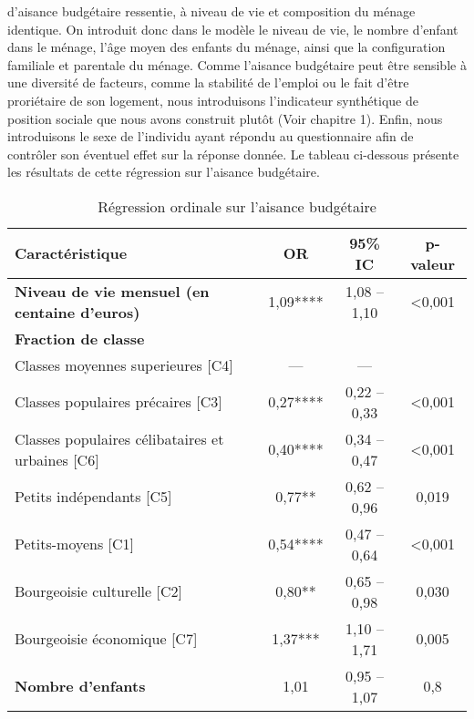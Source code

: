 \documentclass[
  12pt,
]{book}
\begin{document}
d'aisance budgétaire ressentie, à niveau de vie et composition du ménage
identique. On introduit donc dans le modèle le niveau de vie, le nombre
d'enfant dans le ménage, l'âge moyen des enfants du ménage, ainsi que la
configuration familiale et parentale du ménage. Comme l'aisance
budgétaire peut être sensible à une diversité de facteurs, comme la
stabilité de l'emploi ou le fait d'être proriétaire de son logement,
nous introduisons l'indicateur synthétique de position sociale que nous
avons construit plutôt (Voir chapitre 1). Enfin, nous introduisons le
sexe de l'individu ayant répondu au questionnaire afin de contrôler son
éventuel effet sur la réponse donnée. Le tableau ci-dessous présente les
résultats de cette régression sur l'aisance budgétaire.

\begin{table}[!h]
\centering\centering
\caption{\label{tab:AISEreg}Régression ordinale sur l'aisance budgétaire}
\centering
\fontsize{8}{10}\selectfont
\fontsize{7}{9}\selectfont
\begin{threeparttable}
\begin{tabular}[t]{lccc}
\toprule
\textbf{Caractéristique} & \textbf{OR} & \textbf{95\% IC} & \textbf{p-valeur}\\
\midrule
\textbf{Niveau de vie mensuel (en centaine d'euros)} & 1,09**** & 1,08 – 1,10 & <0,001\\
\textbf{Fraction de classe} &  &  & \\
\hspace{1em}Classes moyennes superieures [C4] & — & — & \\
\hspace{1em}Classes populaires précaires [C3] & 0,27**** & 0,22 – 0,33 & <0,001\\
\hspace{1em}Classes populaires célibataires et urbaines [C6] & 0,40**** & 0,34 – 0,47 & <0,001\\
\addlinespace
\hspace{1em}Petits indépendants [C5] & 0,77** & 0,62 – 0,96 & 0,019\\
\hspace{1em}Petits-moyens [C1] & 0,54**** & 0,47 – 0,64 & <0,001\\
\hspace{1em}Bourgeoisie culturelle [C2] & 0,80** & 0,65 – 0,98 & 0,030\\
\hspace{1em}Bourgeoisie économique [C7] & 1,37*** & 1,10 – 1,71 & 0,005\\
\textbf{Nombre d'enfants} & 1,01 & 0,95 – 1,07 & 0,8\\

\end{tabular}
\end{threeparttable}
\end{table}
\end{document}
